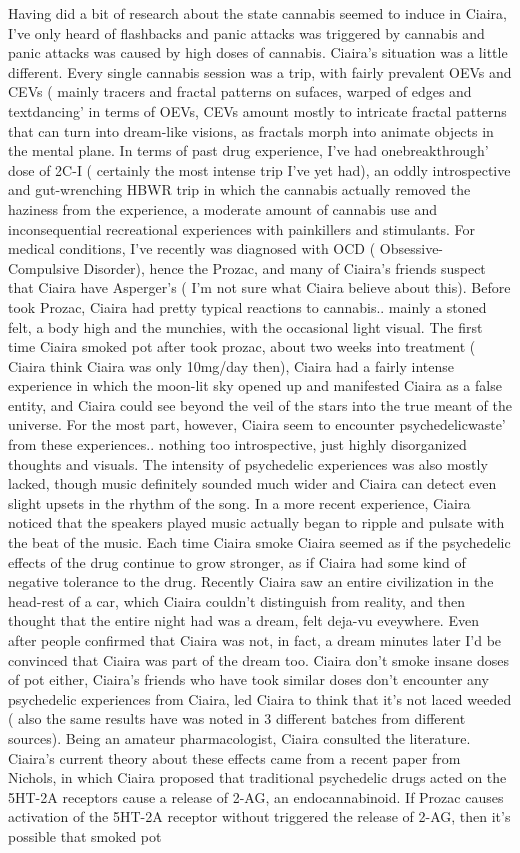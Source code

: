 \documentclass[12pt]{book}
\begin{document}
Having did a bit of research about the state cannabis seemed to induce in Ciaira, I've only heard of flashbacks and panic attacks was triggered by cannabis and panic attacks was caused by high doses of cannabis. Ciaira's situation was a little different. Every single cannabis session was a trip, with fairly prevalent OEVs and CEVs ( mainly tracers and fractal patterns on sufaces, warped of edges and textdancing' in terms of OEVs, CEVs amount mostly to intricate fractal patterns that can turn into dream-like visions, as fractals morph into animate objects in the mental plane. In terms of past drug experience, I've had onebreakthrough' dose of 2C-I ( certainly the most intense trip I've yet had), an oddly introspective and gut-wrenching HBWR trip in which the cannabis actually removed the haziness from the experience, a moderate amount of cannabis use and inconsequential recreational experiences with painkillers and stimulants. For medical conditions, I've recently was diagnosed with OCD ( Obsessive-Compulsive Disorder), hence the Prozac, and many of Ciaira's friends suspect that Ciaira have Asperger's ( I'm not sure what Ciaira believe about this). Before took Prozac, Ciaira had pretty typical reactions to cannabis.. mainly a stoned felt, a body high and the munchies, with the occasional light visual. The first time Ciaira smoked pot after took prozac, about two weeks into treatment ( Ciaira think Ciaira was only 10mg/day then), Ciaira had a fairly intense experience in which the moon-lit sky opened up and manifested Ciaira as a false entity, and Ciaira could see beyond the veil of the stars into the true meant of the universe. For the most part, however, Ciaira seem to encounter psychedelicwaste' from these experiences.. nothing too introspective, just highly disorganized thoughts and visuals. The intensity of psychedelic experiences was also mostly lacked, though music definitely sounded much wider and Ciaira can detect even slight upsets in the rhythm of the song. In a more recent experience, Ciaira noticed that the speakers played music actually began to ripple and pulsate with the beat of the music. Each time Ciaira smoke Ciaira seemed as if the psychedelic effects of the drug continue to grow stronger, as if Ciaira had some kind of negative tolerance to the drug. Recently Ciaira saw an entire civilization in the head-rest of a car, which Ciaira couldn't distinguish from reality, and then thought that the entire night had was a dream, felt deja-vu eveywhere. Even after people confirmed that Ciaira was not, in fact, a dream minutes later I'd be convinced that Ciaira was part of the dream too. Ciaira don't smoke insane doses of pot either, Ciaira's friends who have took similar doses don't encounter any psychedelic experiences from Ciaira, led Ciaira to think that it's not laced weeded ( also the same results have was noted in 3 different batches from different sources). Being an amateur pharmacologist, Ciaira consulted the literature. Ciaira's current theory about these effects came from a recent paper from Nichols, in which Ciaira proposed that traditional psychedelic drugs acted on the 5HT-2A receptors cause a release of 2-AG, an endocannabinoid. If Prozac causes activation of the 5HT-2A receptor without triggered the release of 2-AG, then it's possible that smoked pot 
\end{document}
